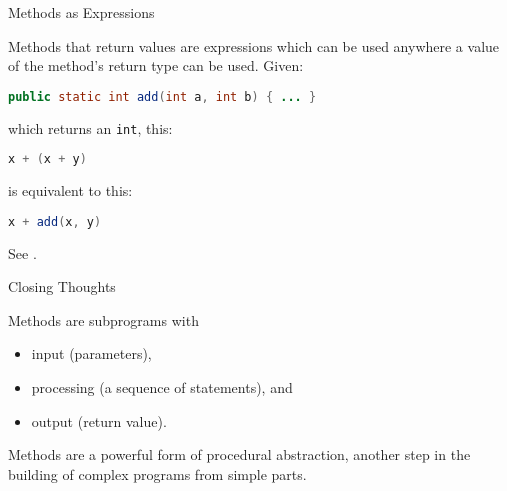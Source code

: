 \documentclass{beamer}
\begin{document}
\begin{frame}[fragile]{Methods as Expressions}

Methods that return values are expressions which can be used anywhere a value of the method's return type can be used.  Given:

\begin{lstlisting}[language=Java]
public static int add(int a, int b) { ... }
\end{lstlisting}
which returns an {\tt int}, this:
\begin{lstlisting}[language=Java]
x + (x + y)
\end{lstlisting}
is equivalent to this:
\begin{lstlisting}[language=Java]
x + add(x, y)
\end{lstlisting}
See .

\end{frame}


\begin{frame}[fragile]{Closing Thoughts}

Methods are subprograms with
\begin{itemize}
\item input (parameters),
\item processing (a sequence of statements), and
\item output (return value).
\end{itemize}

Methods are a powerful form of procedural abstraction, another step in the building of complex programs from simple parts.

\end{frame}






\end{document}
